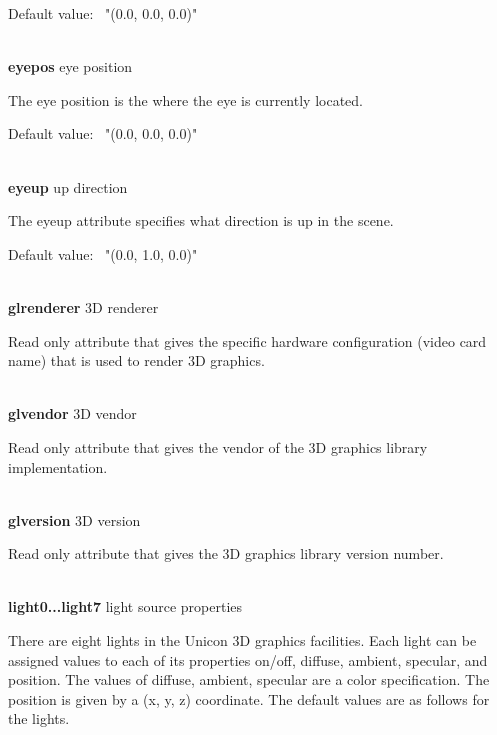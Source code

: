 \documentclass[letterpaper]{article}
\begin{document}
{Default value: \ \textsf{"(0.0, 0.0, 0.0)"}

\noindent\hrulefill\\
\noindent\textsf{\textbf{eyepos}} \hfill eye position


\bigskip

The eye position is the where the eye is currently located.


\bigskip

Default value: \ \textsf{"(0.0, 0.0, 0.0)"}

\noindent\hrulefill\\
\noindent\textsf{\textbf{eyeup}} \hfill up direction


\bigskip

The eyeup attribute specifies what direction is up in the scene.


\bigskip

Default value: \ \textsf{"(0.0, 1.0, 0.0)"}

\noindent\hrulefill\\
\noindent\textsf{\textbf{glrenderer}} \hfill 3D renderer


\bigskip

Read only attribute that gives the specific hardware configuration
(video card name) that is used to render 3D graphics.

\noindent\hrulefill\\
\noindent\textsf{\textbf{glvendor}} \hfill 3D vendor


\bigskip

Read only attribute that gives the vendor of the 3D graphics
library implementation.

\noindent\hrulefill\\
\noindent\textsf{\textbf{glversion}} \hfill 3D version


\bigskip

Read only attribute that gives the 3D graphics library version number.


\bigskip

\noindent\hrulefill\\
\noindent\textsf{\textbf{light0...light7}} \hfill light source properties


\bigskip

There are eight lights in the Unicon 3D graphics facilities. Each
light can be assigned values to each of its properties on/off,
diffuse, ambient, specular, and position. The values of diffuse,
ambient, specular are a color specification.  The position is given by
a (x, y, z) coordinate. The default values are as follows for the
lights.


}
\end{document}
